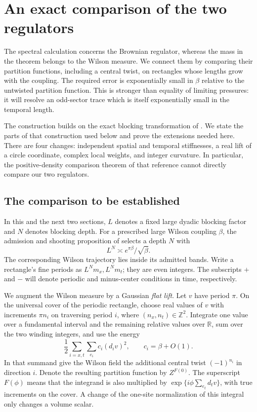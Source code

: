 \section{An exact comparison of the two regulators}
\label{sec:rg}

The spectral calculation concerns the Brownian regulator, whereas the
mass in the theorem belongs to the Wilson measure.  We connect them by
comparing their partition functions, including a central twist, on
rectangles whose lengths grow with the coupling.  The required error is
exponentially small in $\beta$ relative to the untwisted partition
function.  This is stronger than equality of limiting pressures: it
will resolve an odd-sector trace which is itself exponentially small in
the temporal length.

The construction builds on the exact blocking transformation of
\cite[Sections ``The linear block transformation'', ``An exact
renormalization map'', and ``Admission and terminal-coupling
matching'']{SharpO4}.  We state the parts of that construction used below
and prove the extensions needed here.  There are four changes: independent
spatial and temporal stiffnesses, a real lift of a circle coordinate,
complex local weights, and integer curvature.  In particular, the
positive-density comparison theorem of that reference cannot directly
compare our two regulators.

\subsection{The comparison to be established}

In this and the next two sections, $L$ denotes a fixed large dyadic
blocking factor and $N$ denotes blocking depth.  For a prescribed large
Wilson coupling $\beta$, the admission and shooting proposition of
\cite[Section ``Admission and terminal-coupling matching'']{SharpO4}
selects a depth $N$ with
\[
                    L^N\asymp e^{\pi\beta}/\sqrt\beta.
\]
The corresponding Wilson trajectory lies inside its admitted bands.
Write a rectangle's fine periods as $L^N m_x,L^N m_t$; they are even
integers.  The subscripts $+$ and $-$ will denote periodic and
minus-center conditions in time, respectively.

We augment the Wilson measure by a Gaussian \emph{flat lift}.  Let $v$
have period $\pi$.  On the universal cover of the periodic rectangle,
choose real values of $v$ with increments $\pi n_i$ on traversing period
$i$, where $(n_x,n_t)\in\mathbb Z^2$.  Integrate one value over a
fundamental interval and the remaining relative values over $\mathbb R$,
sum over the two winding integers, and use the energy
\[
                   \frac12\sum_{i=x,t}\sum_{e_i}c_i(d_i v)^2,
                   \qquad c_i=\beta+O(1).
\]
In that summand give the Wilson field the additional central twist
$(-1)^{n_i}$ in direction $i$.  Denote the resulting partition function
by $Z^{F(0)}$.  The superscript $F(\phi)$ means that the integrand is
also multiplied by $\exp\{i\phi\sum_{e_t}d_t v\}$, with true increments
on the cover.  A change of the one-site normalization of this integral
only changes a volume scalar.

